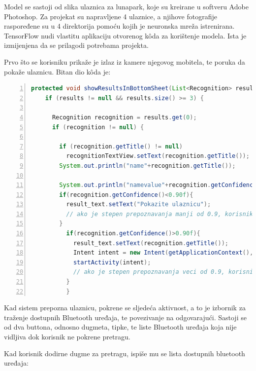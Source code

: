 Model se sastoji od slika ulaznica za lunapark, koje su kreirane u softveru Adobe Photoshop. Za projekat su napravljene 4 ulaznice, a njihove fotografije raspoređene su u 4 direktorija pomoću kojih je neuronska mreža istrenirana. TensorFlow nudi vlastitu aplikaciju otvorenog kôda za korištenje modela. Ista je izmijenjena da se prilagodi potrebama projekta.

Prvo što se korisniku prikaže je izlaz iz kamere njegovog mobitela, te poruka da pokaže ulaznicu. Bitan dio kôda je:

\begin{lstlisting}[frame=single,language=Java,numbers=left, numberstyle=\tiny, xleftmargin=0.05\textwidth, xrightmargin=0.05\textwidth, basicstyle=\ttfamily\footnotesize]
 protected void showResultsInBottomSheet(List<Recognition> results) {
    if (results != null && results.size() >= 3) {

      Recognition recognition = results.get(0);
      if (recognition != null) {

        if (recognition.getTitle() != null)
          recognitionTextView.setText(recognition.getTitle());
        System.out.println("name"+recognition.getTitle());

        System.out.println("namevalue"+recognition.getConfidence());
        if(recognition.getConfidence()<0.90f){
          result_text.setText("Pokazite ulaznicu"); 
          // ako je stepen prepoznavanja manji od 0.9, korisniku se ispisuje poruka da pokaze ulaznicu
        }
          if(recognition.getConfidence()>0.90f){
            result_text.setText(recognition.getTitle());
            Intent intent = new Intent(getApplicationContext(), BtActivity.class);
            startActivity(intent);
            // ako je stepen prepoznavanja veci od 0.9, korisnika se prebacuje na Bluetooth aktivnost
          }
          }
          \end{lstlisting}

Kad sistem prepozna ulaznicu, pokrene se sljedeća aktivnost, a to je izbornik za traženje dostupnih Bluetooth uređaja, te povezivanje na odgovarajući. Sastoji se od dva buttona, odnosno dugmeta, tipke, te liste Bluetooth uređaja koja nije vidljiva dok korisnik ne pokrene pretragu.

Kad korisnik dodirne dugme za pretragu, ispiše mu se lista dostupnih bluetooth uređaja:

